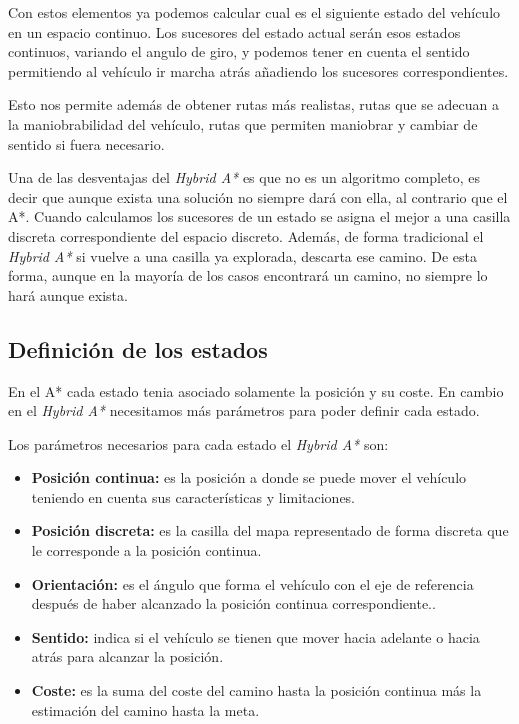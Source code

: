 Con estos elementos ya podemos calcular cual es el siguiente estado del vehículo en un espacio continuo. Los sucesores del estado actual serán esos estados continuos, variando el angulo de giro, y podemos tener en cuenta el sentido permitiendo al vehículo ir marcha atrás añadiendo los sucesores correspondientes.

Esto nos permite además de obtener rutas más realistas, rutas que se adecuan a la maniobrabilidad del vehículo,  rutas que permiten maniobrar y cambiar de sentido si fuera necesario.

Una de las desventajas del \textit{Hybrid A*} es que no es un algoritmo completo, es decir que aunque exista una solución no siempre dará con ella, al contrario que el A*. Cuando calculamos los sucesores de un estado se asigna el mejor a una casilla discreta correspondiente del espacio discreto. Además, de forma tradicional el \textit{Hybrid A*} si vuelve a una casilla ya explorada, descarta ese camino. De esta forma, aunque en la mayoría de los casos encontrará un camino, no siempre lo hará aunque exista.

\subsection{Definición de los estados}
En el A* cada estado tenia asociado solamente la posición y su coste. En cambio en el \textit{Hybrid A*} necesitamos más parámetros para poder definir cada estado.

Los parámetros necesarios para cada estado el \textit{Hybrid A*} son:
\begin{itemize}
\item \textbf{Posición continua:} es la posición a donde se puede mover el vehículo teniendo en cuenta sus características y limitaciones.
\item \textbf{Posición discreta:} es la casilla del mapa representado de forma discreta que le corresponde a la posición continua.
\item \textbf{Orientación:} es el ángulo que forma el vehículo con el eje de referencia después de haber alcanzado la posición continua correspondiente..
\item \textbf{Sentido:} indica si el vehículo se tienen que mover hacia adelante o hacia atrás para alcanzar la posición.
\item \textbf{Coste:} es la suma del coste del camino hasta la posición continua más la estimación del camino hasta la meta.
\end{itemize}

